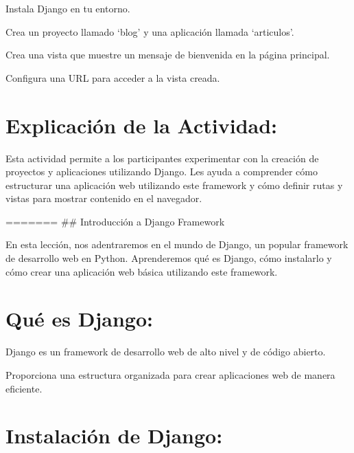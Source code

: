 \documentclass[
  a4paper,
  onepage,
  openany]{scrreprt}
\begin{document}
\begin{tcolorbox}[enhanced jigsaw, breakable, opacityback=0, toptitle=1mm, coltitle=black, toprule=.15mm, rightrule=.15mm, colframe=quarto-callout-important-color-frame, opacitybacktitle=0.6, arc=.35mm, title=\textcolor{quarto-callout-important-color}{\faExclamation}\hspace{0.5em}{Actividad Práctica:}, titlerule=0mm, colbacktitle=quarto-callout-important-color!10!white, bottomtitle=1mm, bottomrule=.15mm, colback=white, left=2mm, leftrule=.75mm]

Instala Django en tu entorno.

Crea un proyecto llamado `blog' y una aplicación llamada `articulos'.

Crea una vista que muestre un mensaje de bienvenida en la página
principal.

Configura una URL para acceder a la vista creada.

\end{tcolorbox}

\hypertarget{explicaciuxf3n-de-la-actividad-80}{%
\section{Explicación de la
Actividad:}\label{explicaciuxf3n-de-la-actividad-80}}

Esta actividad permite a los participantes experimentar con la creación
de proyectos y aplicaciones utilizando Django. Les ayuda a comprender
cómo estructurar una aplicación web utilizando este framework y cómo
definir rutas y vistas para mostrar contenido en el navegador.

======= \#\# Introducción a Django Framework

En esta lección, nos adentraremos en el mundo de Django, un popular
framework de desarrollo web en Python. Aprenderemos qué es Django, cómo
instalarlo y cómo crear una aplicación web básica utilizando este
framework.

\hypertarget{quuxe9-es-django-1}{%
\section{Qué es Django:}\label{quuxe9-es-django-1}}

Django es un framework de desarrollo web de alto nivel y de código
abierto.

Proporciona una estructura organizada para crear aplicaciones web de
manera eficiente.

\hypertarget{instalaciuxf3n-de-django-1}{%
\section{Instalación de Django:}\label{instalaciuxf3n-de-django-1}}
\end{document}
